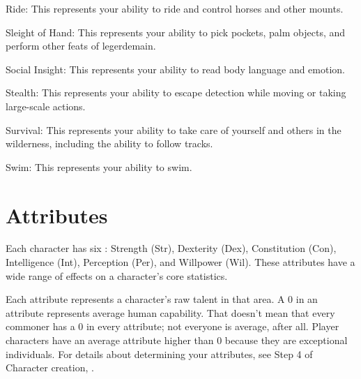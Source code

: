 \begin{raggeditemize}
            \item Ride: This represents your ability to ride and control horses and other mounts.
            \item Sleight of Hand: This represents your ability to pick pockets, palm objects, and perform other feats of legerdemain.
            \item Social Insight: This represents your ability to read body language and emotion.
            \item Stealth: This represents your ability to escape detection while moving or taking large-scale actions.
            \item Survival: This represents your ability to take care of yourself and others in the wilderness, including the ability to follow tracks.
            \item Swim: This represents your ability to swim.
        \end{raggeditemize}

\section{Attributes}\label{Attributes}

    Each character has six : Strength (Str), Dexterity (Dex), Constitution (Con), Intelligence (Int), Perception (Per), and Willpower (Wil).
    These attributes have a wide range of effects on a character's core statistics.

    Each attribute represents a character's raw talent in that area.
    A 0 in an attribute represents average human capability.
    That doesn't mean that every commoner has a 0 in every attribute; not everyone is average, after all.
    Player characters have an average attribute higher than 0 because they are exceptional individuals.
    For details about determining your attributes, see Step 4 of Character creation, .

